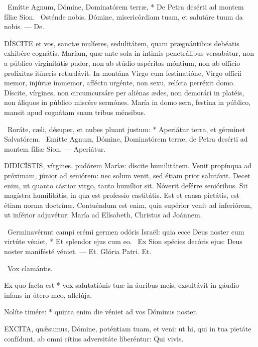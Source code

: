 \R\ Emítte Agnum, Dómine, Dominatórem terræ, * De Petra desérti ad montem fíliæ Sion. \V\ Osténde nobis, Dómine, misericórdiam tuam, et salutáre tuum da nobis. --- De.


\lettrine[lines=2]{D}{ÍSCITE} et vos, sanctæ mulíeres, sedulitátem, quam prægnántibus debéatis exhibére cognátis. Maríam, quæ ante sola in íntimis penetrálibus versabátur, non a público virginitátis pudor, non ab stúdio aspéritas móntium, non ab offício prolíxitas itíneris retardávit. In montána Virgo cum festinatióne, Virgo offícii memor, injúriæ ímmemor, afféctu urgénte, non sexu, relícta perréxit domo. Díscite, vírgines, non circumcursáre per aliénas ædes, non demorári in platéis, non áliquos in público miscére sermónes. María in domo sera, festína in público, mansit apud cognátam suam tribus ménsibus.

\V\ Roráte, cæli, désuper, et nubes pluant justum: * Aperiátur terra, et gérminet Salvatórem. \V\ Emítte Agnum, Dómine, Dominatórem terræ, de Petra desérti ad montem fíliæ Sion. --- Aperiátur.


\lettrine[lines=2]{D}{IDICÍSTIS}, vírgines, pudórem Maríæ: díscite humilitátem. Venit propínqua ad próximam, júnior ad seniórem: nec solum venit, sed étiam prior salutávit. Decet enim, ut quanto cástior virgo, tanto humílior sit. Nóverit deférre senióribus. Sit magístra humilitátis, in qua est professio castitátis. Est et causa pietátis, est étiam norma doctrínæ. Contuéndum est enim, quia supérior venit ad inferiórem, ut inférior adjuvétur: María ad Elísabeth, Christus ad Joánnem.

\R\ Germinavérunt campi erémi germen odóris Israël: quia ecce Deus noster cum virtúte véniet, * Et splendor ejus cum eo. \V\ Ex Sion spécies decóris ejus: Deus noster manifésté véniet. --- Et. Glória Patri. Et.

\V\ Vox clamántis.

 Ex quo facta est * vox salutatiónis tuæ in áuribus meis, exsultávit in gáudio infans in útero meo, allelúja.


 Nolíte timére: * quinta enim die véniet ad vos Dóminus noster.


\lettrine[lines=2]{E}{XCITA}, quǽsumus, Dómine, poténtiam tuam, et veni: ut hi, qui in tua pietáte confídunt, ab omni cítius adversitáte liberéntur: Qui vivis.

